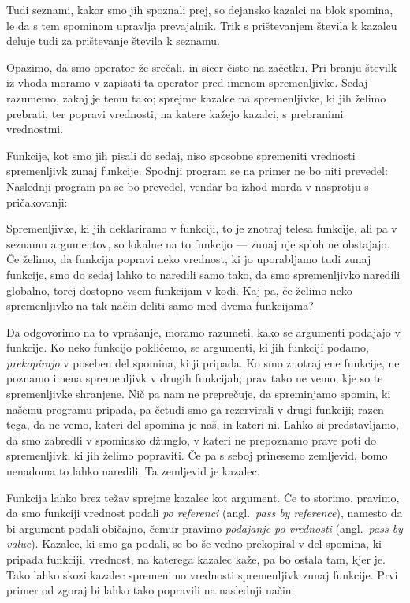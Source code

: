 Tudi seznami, kakor smo jih spoznali prej, so dejansko kazalci na blok spomina,
le da s tem spominom upravlja prevajalnik.
Trik s prištevanjem števila k kazalcu deluje tudi za prištevanje števila k
seznamu.


Opazimo, da smo operator \koda{&} že srečali, in sicer čisto na začetku.
Pri branju številk iz vhoda moramo v  zapisati ta operator pred
imenom spremenljivke.
Sedaj razumemo, zakaj je temu tako;  sprejme kazalce na
spremenljivke, ki jih želimo prebrati, ter popravi vrednosti, na katere kažejo
kazalci, s prebranimi vrednostmi.

Funkcije, kot smo jih pisali do sedaj, niso sposobne spremeniti vrednosti
spremenljivk zunaj funkcije.
Spodnji program se na primer ne bo niti prevedel:
%
%
Naslednji program pa se bo prevedel, vendar bo izhod morda v nasprotju s
pričakovanji:
%

Spremenljivke, ki jih deklariramo v funkciji, to je znotraj telesa funkcije,
ali pa v seznamu argumentov, so lokalne na to funkcijo --- zunaj nje sploh ne
obstajajo.
Če želimo, da funkcija popravi neko vrednost, ki jo uporabljamo tudi
zunaj funkcije, smo do sedaj lahko to naredili samo tako, da smo spremenljivko
naredili globalno, torej dostopno vsem funkcijam v kodi.
Kaj pa, če želimo neko spremenljivko na tak način deliti samo med dvema
funkcijama?

Da odgovorimo na to vprašanje, moramo razumeti, kako se argumenti podajajo v
funkcije.
Ko neko funkcijo pokličemo, se argumenti, ki jih funkciji podamo,
\emph{prekopirajo} v poseben del spomina, ki ji pripada.
Ko smo znotraj ene funkcije, ne poznamo imena spremenljivk v drugih funkcijah;
prav tako ne vemo, kje so te spremenljivke shranjene.
Nič pa nam ne preprečuje, da spreminjamo spomin, ki našemu programu pripada, pa
četudi smo ga rezervirali v drugi funkciji; razen tega, da ne vemo, kateri del
spomina je naš, in kateri ni.
Lahko si predstavljamo, da smo zabredli v spominsko džunglo, v kateri ne
prepoznamo prave poti do spremenljivk, ki jih želimo popraviti.
Če pa s seboj prinesemo zemljevid, bomo nenadoma to lahko naredili.
Ta zemljevid je kazalec.

Funkcija lahko brez težav sprejme kazalec kot argument.
Če to storimo, pravimo, da smo funkciji vrednost podali \emph{po referenci}
(angl.~\textit{pass by reference}), namesto da bi argument podali običajno,
čemur pravimo \emph{podajanje po vrednosti} (angl.~\textit{pass by value}).
Kazalec, ki smo ga podali, se bo še vedno prekopiral v del spomina, ki pripada
funkciji, vrednost, na katerega kazalec kaže, pa bo ostala tam, kjer je.
Tako lahko skozi kazalec spremenimo vrednosti spremenljivk zunaj funkcije.
Prvi primer od zgoraj bi lahko tako popravili na naslednji način:


